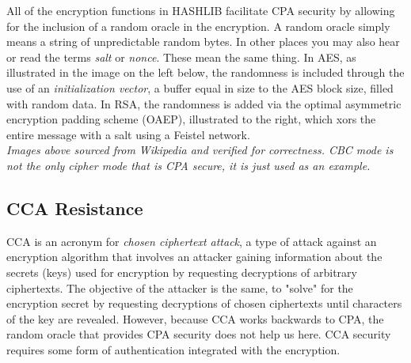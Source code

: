 \documentclass[titlepage]{article}
\begin{document}
			All of the encryption functions in HASHLIB facilitate CPA security by allowing for the inclusion of a random oracle in the encryption. A random oracle simply means a string of unpredictable random bytes. In other places you may also hear or read the terms \textit{salt} or \textit{nonce}. These mean the same thing. In AES, as illustrated in the image on the left below, the randomness is included through the use of an \textit{initialization vector}, a buffer equal in size to the AES block size, filled with random data. In RSA, the randomness is added via the optimal asymmetric encryption padding scheme (OAEP), illustrated to the right, which xors the entire message with a salt using a Feistel network.\\
			\textit{Images above sourced from Wikipedia and verified for correctness. CBC mode is not the only cipher mode that is CPA secure, it is just used as an example.}
		\subsection{CCA Resistance}
			CCA is an acronym for \textit{chosen ciphertext attack}, a type of attack against an encryption algorithm that involves an attacker gaining information about the secrets (keys) used for encryption by requesting decryptions of arbitrary ciphertexts. The objective of the attacker is the same, to "solve" for the encryption secret by requesting decryptions of chosen ciphertexts until characters of the key are revealed. However, because CCA works backwards to CPA, the random oracle that provides CPA security does not help us here. CCA security requires some form of authentication integrated with the encryption.
			
\end{document}
